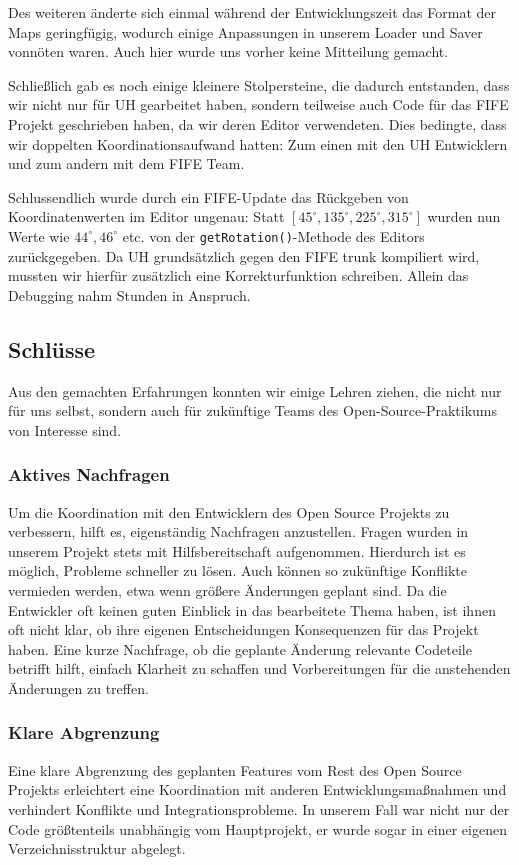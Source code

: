 Des weiteren änderte sich einmal während der Entwicklungszeit das Format der
Maps geringfügig, wodurch einige Anpassungen in unserem Loader und Saver vonnöten
waren. Auch hier wurde uns vorher keine Mitteilung gemacht.

Schließlich gab es noch einige kleinere Stolpersteine, die dadurch entstanden,
dass wir nicht nur für UH gearbeitet haben, sondern teilweise auch Code
für das FIFE Projekt geschrieben haben, da wir deren Editor verwendeten.
Dies bedingte, dass wir doppelten Koordinationsaufwand hatten: Zum einen mit
den UH Entwicklern und zum andern mit dem FIFE Team.

Schlussendlich wurde durch ein FIFE-Update das Rückgeben von Koordinatenwerten
im Editor ungenau: Statt $[45^\circ, 135^\circ, 225^\circ, 315^\circ]$ wurden
nun Werte wie $44^\circ, 46^\circ$ etc. von der {\tt getRotation()}-Methode des
Editors zurückgegeben.
Da UH grundsätzlich gegen den FIFE trunk kompiliert wird, mussten wir hierfür
zusätzlich eine Korrekturfunktion schreiben. Allein das Debugging nahm Stunden
in Anspruch.

\subsection{Schlüsse}
Aus den gemachten Erfahrungen konnten wir einige Lehren ziehen, die nicht nur
für uns selbst, sondern auch für zukünftige Teams des Open-Source-Praktikums
von Interesse sind.

\subsubsection{Aktives Nachfragen}
Um die Koordination mit den Entwicklern des Open Source Projekts zu verbessern,
hilft es, eigenständig Nachfragen anzustellen. Fragen wurden in
unserem Projekt stets mit Hilfsbereitschaft aufgenommen. Hierdurch ist es möglich,
Probleme schneller zu lösen. Auch können so zukünftige Konflikte vermieden werden,
etwa wenn größere Änderungen geplant sind. Da die Entwickler oft keinen guten
Einblick in das bearbeitete Thema haben, ist ihnen oft nicht klar, ob ihre eigenen
Entscheidungen Konsequenzen für das Projekt haben. Eine kurze Nachfrage, ob die
geplante Änderung relevante Codeteile betrifft hilft, einfach Klarheit zu schaffen
und Vorbereitungen für die anstehenden Änderungen zu treffen.

\subsubsection{Klare Abgrenzung}
Eine klare Abgrenzung des geplanten Features vom Rest des Open Source Projekts
erleichtert eine Koordination mit anderen Entwicklungsmaßnahmen und verhindert
Konflikte und Integrationsprobleme. In unserem Fall war nicht nur der Code
größtenteils unabhängig vom Hauptprojekt, er wurde sogar in einer eigenen
Verzeichnisstruktur abgelegt.

